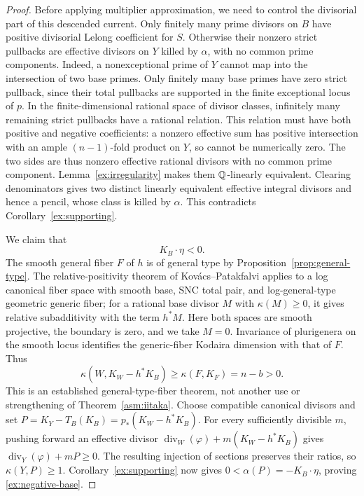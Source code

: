 \begin{proof}
Before applying multiplier approximation, we need to control the
divisorial part of this descended current. Only finitely many prime
divisors on \(B\) have positive
divisorial Lelong coefficient for \(S\). Otherwise their
nonzero strict pullbacks are effective divisors on \(Y\)
killed by \(\alpha\), with no common prime components.
Indeed, a nonexceptional prime of \(Y\) cannot map into the
intersection of two base primes.
Only finitely many base primes have zero strict pullback,
since their total pullbacks are supported in the finite
exceptional locus of \(p\). In the finite-dimensional rational
space of divisor classes, infinitely many remaining strict
pullbacks have a rational relation. This relation must have
both positive and negative coefficients: a nonzero effective
sum has positive intersection with an ample \((n-1)\)-fold
product on \(Y\), so cannot be numerically zero. The two sides
are thus nonzero effective rational divisors with no common
prime component. Lemma~\ref{ex:irregularity} makes them
\(\mathbb{Q}\)-linearly equivalent. Clearing denominators gives two
distinct linearly equivalent effective integral divisors and
hence a pencil, whose class is killed by \(\alpha\). This
contradicts Corollary~\ref{ex:supporting}.

We claim that
\begin{equation}\label{ex:negative-base}
 K_B\cdot\eta<0.
\end{equation}
The smooth general fiber \(F\) of \(h\) is of general type by
Proposition~\ref{prop:general-type}. The relative-positivity
theorem of Kov\'acs--Patakfalvi
\cite[Theorem~9.9]{KovacsPatakfalvi2017} applies to a log
canonical fiber space with smooth base, SNC total pair, and
log-general-type geometric generic fiber; for a rational base
divisor \(M\) with \(\kappa(M)\geq0\), it gives relative
subadditivity with the term \(h^*M\). Here both spaces are
smooth projective, the boundary is zero, and we take \(M=0\).
Invariance of plurigenera on the smooth locus identifies the
generic-fiber Kodaira dimension with that of \(F\). Thus
\begin{equation}\label{ex:relative-positive}
 \kappa(W,K_W-h^*K_B)\geq \kappa(F,K_F)=n-b>0.
\end{equation}
This is an established general-type-fiber theorem, not another
use or strengthening of Theorem~\ref{asm:iitaka}.
Choose compatible canonical divisors and set
\(P=K_Y-T_B(K_B)=p_*(K_W-h^*K_B)\).
For every sufficiently divisible \(m\), pushing forward an
effective divisor
\(\operatorname{div}_W(\varphi)+m(K_W-h^*K_B)\)
gives
\(\operatorname{div}_Y(\varphi)+mP\geq0\).
The resulting injection of sections preserves their ratios,
so \(\kappa(Y,P)\geq1\). Corollary~\ref{ex:supporting} now gives
\(0<\alpha(P)=-K_B\cdot\eta\), proving
\eqref{ex:negative-base}.


\end{proof}
